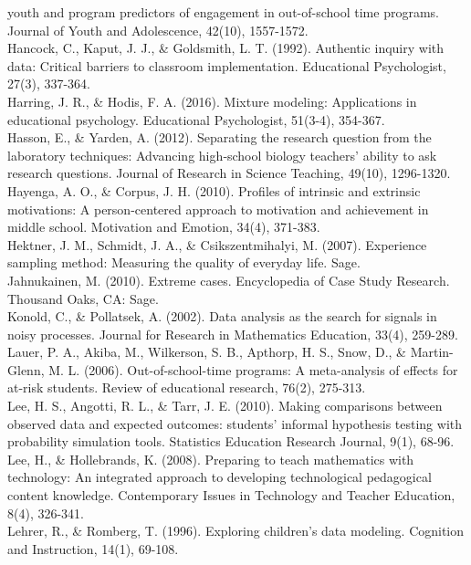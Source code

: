 \documentclass[]{msu-thesis}
\theoremstyle{definition}
\theoremstyle{definition}
\theoremstyle{definition}
\theoremstyle{remark}
\begin{document}
youth and program predictors of engagement in out-of-school time
programs. Journal of Youth and Adolescence, 42(10), 1557-1572.\\
Hancock, C., Kaput, J. J., \& Goldsmith, L. T. (1992). Authentic inquiry
with data: Critical barriers to classroom implementation. Educational
Psychologist, 27(3), 337-364.\\
Harring, J. R., \& Hodis, F. A. (2016). Mixture modeling: Applications
in educational psychology. Educational Psychologist, 51(3-4), 354-367.\\
Hasson, E., \& Yarden, A. (2012). Separating the research question from
the laboratory techniques: Advancing high‐school biology teachers'
ability to ask research questions. Journal of Research in Science
Teaching, 49(10), 1296-1320.\\
Hayenga, A. O., \& Corpus, J. H. (2010). Profiles of intrinsic and
extrinsic motivations: A person-centered approach to motivation and
achievement in middle school. Motivation and Emotion, 34(4), 371-383.\\
Hektner, J. M., Schmidt, J. A., \& Csikszentmihalyi, M. (2007).
Experience sampling method: Measuring the quality of everyday life.
Sage.\\
Jahnukainen, M. (2010). Extreme cases. Encyclopedia of Case Study
Research. Thousand Oaks, CA: Sage.\\
Konold, C., \& Pollatsek, A. (2002). Data analysis as the search for
signals in noisy processes. Journal for Research in Mathematics
Education, 33(4), 259-289.\\
Lauer, P. A., Akiba, M., Wilkerson, S. B., Apthorp, H. S., Snow, D., \&
Martin-Glenn, M. L. (2006). Out-of-school-time programs: A meta-analysis
of effects for at-risk students. Review of educational research, 76(2),
275-313.\\
Lee, H. S., Angotti, R. L., \& Tarr, J. E. (2010). Making comparisons
between observed data and expected outcomes: students' informal
hypothesis testing with probability simulation tools. Statistics
Education Research Journal, 9(1), 68-96.\\
Lee, H., \& Hollebrands, K. (2008). Preparing to teach mathematics with
technology: An integrated approach to developing technological
pedagogical content knowledge. Contemporary Issues in Technology and
Teacher Education, 8(4), 326-341.\\
Lehrer, R., \& Romberg, T. (1996). Exploring children's data modeling.
Cognition and Instruction, 14(1), 69-108.\\
\end{document}
